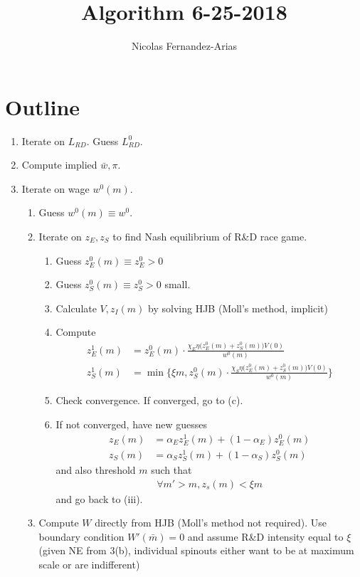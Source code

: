 \documentclass[12pt,english]{article}
\theoremstyle{remark}
\begin{document}
	
\title{Algorithm 6-25-2018}
\author{Nicolas Fernandez-Arias}
\maketitle

\section{Outline}

\begin{enumerate}
	\item Iterate on $L_{RD}$. Guess $L^0_{RD}$.  
	\item Compute implied $\bar{w},\pi$.
	\item Iterate on wage $w^0(m)$. 
	\begin{enumerate}
		\item Guess $w^0(m) \equiv w^0$.
		\item Iterate on $z_E,z_S$ to find Nash equilibrium of R\&D race game.
		\begin{enumerate}
			\item Guess $z_E^0(m) \equiv z_E^0 > 0$
			\item Guess $z_S^0(m) \equiv z_S^0 > 0$ small.
			\item Calculate $V,z_I(m)$ by solving HJB (Moll's method, implicit)
			\item Compute
			\begin{align*}
			z_E^1(m) &= z_E^0(m) \cdot \frac{\chi_E \eta \big(z_E^0(m) + z_S^0(m)\big)V(0)}{w^0(m)} \\
			z_S^1(m) &= \min\Bigg\{\xi m,z_S^0(m) \cdot \frac{\chi_S \eta \big(z_E^0(m) + z_S^0(m)\big)V(0)}{w^0(m)}\Bigg\}
			\end{align*}
			\item Check convergence. If converged, go to (c).
			\item If not converged, have new guesses
			\begin{align*}
			z_E(m) &= \alpha_E z_E^1(m) + (1-\alpha_E) z_E^0(m) \\
			z_S(m) &= \alpha_S z_S^1(m) + (1-\alpha_S) z_S^0(m) 
			\end{align*}
			and also threshold $m$ such that
			\begin{align*}
				\forall m' > m, z_s(m) < \xi m
			\end{align*}
			and go back to (iii). 
		\end{enumerate} 
		\item Compute $W$ directly from HJB (Moll's method not required). Use boundary condition $W'(\bar{m}) = 0$ and assume R\&D intensity equal to $\xi$ (given NE from 3(b), individual spinouts either want to be at maximum scale or are indifferent)

\end{enumerate}
\end{enumerate}
\end{document}
